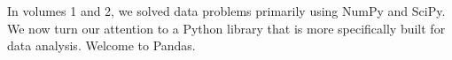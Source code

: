 
In volumes 1 and 2, we solved data problems primarily using NumPy and SciPy. 
We now turn our attention to a Python library that is more specifically built for data
analysis. Welcome to Pandas.

